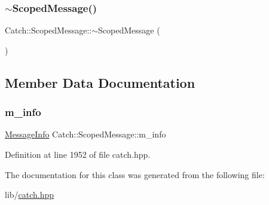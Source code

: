 \hypertarget{class_catch_1_1_scoped_message_a43190843f9eeb84a0b42b0bc95fdf93a}{}\label{class_catch_1_1_scoped_message_a43190843f9eeb84a0b42b0bc95fdf93a} 
\subsubsection{\texorpdfstring{$\sim$\+Scoped\+Message()}{~ScopedMessage()}}
{\footnotesize\ttfamily Catch\+::\+Scoped\+Message\+::$\sim$\+Scoped\+Message (\begin{DoxyParamCaption}{ }\end{DoxyParamCaption})}



\subsection{Member Data Documentation}
\hypertarget{class_catch_1_1_scoped_message_ae6e1476f389cc6e1586f033b3747b27b}{}\label{class_catch_1_1_scoped_message_ae6e1476f389cc6e1586f033b3747b27b} 
\subsubsection{\texorpdfstring{m\+\_\+info}{m\_info}}
{\footnotesize\ttfamily \hyperlink{struct_catch_1_1_message_info}{Message\+Info} Catch\+::\+Scoped\+Message\+::m\+\_\+info}



Definition at line 1952 of file catch.\+hpp.



The documentation for this class was generated from the following file\+:\begin{DoxyCompactItemize}
\item 
lib/\hyperlink{catch_8hpp}{catch.\+hpp}\end{DoxyCompactItemize}
